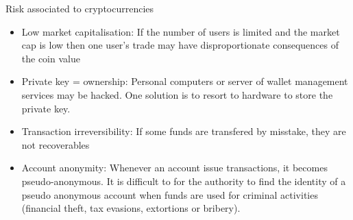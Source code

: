 \documentclass{beamer}
\begin{document}
\begin{frame}{Risk associated to cryptocurrencies}
\begin{itemize}
  \item Low market capitalisation: If the number of users is limited and the market cap is low then one user's trade may have disproportionate consequences of the coin value
  \item Private key = ownership:  Personal computers or server of wallet management services may be hacked. One solution is to resort to hardware to store the private key. 
  \item Transaction irreversibility: If some funds are transfered by misstake, they are not recoverables
  \item Account anonymity: Whenever an account issue transactions, it becomes pseudo-anonymous. It is difficult to for the authority to find the identity of a pseudo anonymous account when funds are used for criminal activities (financial theft, tax evasions, extortions or bribery). 
\end{itemize}
\end{frame}
\end{document}
